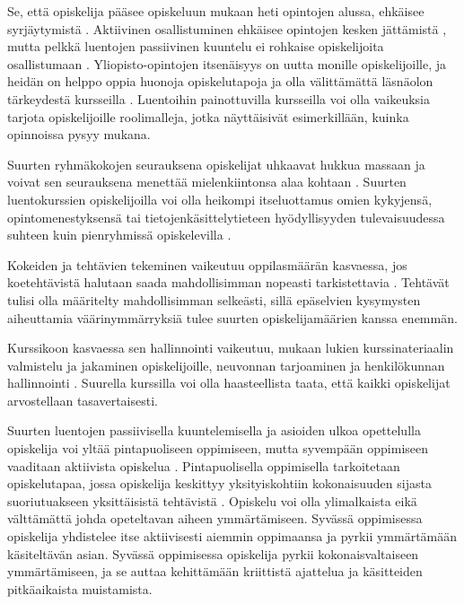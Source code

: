 \documentclass[finnish]{tktltiki2}
\theoremstyle{definition}
\theoremstyle{remark}
\begin{document}
Se, että opiskelija pääsee opiskeluun mukaan heti opintojen alussa, ehkäisee syrjäytymistä \cite{Settle12}. Aktiivinen osallistuminen ehkäisee opintojen kesken jättämistä \cite{Boyer07}, mutta pelkkä luentojen passiivinen kuuntelu ei rohkaise opiskelijoita osallistumaan \cite{Kopp00}. Yliopisto-opintojen itsenäisyys on uutta monille opiskelijoille, ja heidän on helppo oppia huonoja opiskelutapoja ja olla välittämättä läsnäolon tärkeydestä kursseilla \cite{Kopp00}. Luentoihin painottuvilla kursseilla voi olla vaikeuksia tarjota opiskelijoille roolimalleja, jotka näyttäisivät esimerkillään, kuinka opinnoissa pysyy mukana. \par

Suurten ryhmäkokojen seurauksena opiskelijat uhkaavat hukkua massaan ja voivat sen seurauksena menettää mielenkiintonsa alaa kohtaan \cite{Kay98}. Suurten luentokurssien opiskelijoilla voi olla heikompi itseluottamus omien kykyjensä, opintomenestyksensä tai tietojenkäsittelytieteen hyödyllisyyden tulevaisuudessa suhteen kuin pienryhmissä opiskelevilla \cite{Boyer07}. \par

Kokeiden ja tehtävien tekeminen vaikeutuu oppilasmäärän kasvaessa, jos koetehtävistä halutaan saada mahdollisimman nopeasti tarkistettavia \cite{Kay98}. Tehtävät tulisi olla määritelty mahdollisimman selkeästi, sillä epäselvien kysymysten aiheuttamia väärinymmärryksiä tulee suurten opiskelijamäärien kanssa enemmän.  \par

Kurssikoon kasvaessa sen hallinnointi vaikeutuu, mukaan lukien kurssinateriaalin valmistelu ja jakaminen opiskelijoille, neuvonnan tarjoaminen ja henkilökunnan hallinnointi \cite{Chamillard02}. Suurella kurssilla voi olla haasteellista taata, että kaikki opiskelijat arvostellaan tasavertaisesti. \par

Suurten luentojen passiivisella kuuntelemisella ja asioiden ulkoa opettelulla opiskelija voi yltää pintapuoliseen oppimiseen, mutta syvempään oppimiseen vaaditaan aktiivista opiskelua \cite{Boyer07}. Pintapuolisella oppimisella tarkoitetaan opiskelutapaa, jossa opiskelija keskittyy yksityiskohtiin kokonaisuuden sijasta suoriutuakseen yksittäisistä tehtävistä \cite{DeepSurfaceLearning}. Opiskelu voi olla ylimalkaista eikä välttämättä johda opeteltavan aiheen ymmärtämiseen. Syvässä oppimisessa opiskelija yhdistelee itse aktiivisesti aiemmin oppimaansa ja pyrkii ymmärtämään käsiteltävän asian. Syvässä oppimisessa opiskelija pyrkii kokonaisvaltaiseen ymmärtämiseen, ja se auttaa kehittämään kriittistä ajattelua ja käsitteiden pitkäaikaista muistamista. \par
\end{document}
